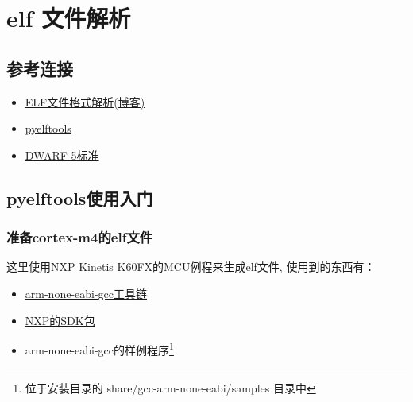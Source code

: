\chapter{elf 文件解析}

\section{参考连接}
\begin{itemize}  
    \item \href{https://www.openeuler.org/zh/blog/lijiajie128/2020-11-03-ELF文件格式解析.html}{ELF文件格式解析(博客)}
    \item \href{https://github.com/eliben/pyelftools}{pyelftools}
    \item \href{https://dwarfstd.org/doc/DWARF5.pdf}{DWARF 5标准}
\end{itemize}

\section{pyelftools使用入门}

\subsection{准备cortex-m4的elf文件}

这里使用NXP Kinetis K60FX的MCU例程来生成elf文件,
使用到的东西有：
\begin{itemize}
    \item \href{https://developer.arm.com/-/media/Files/downloads/gnu/13.2.rel1/binrel/arm-gnu-toolchain-13.2.rel1-x86_64-arm-none-eabi.tar.xz}{arm-none-eabi-gcc工具链}
    \item \href{https://mcuxpresso.nxp.com/}{NXP的SDK包}
    \item arm-none-eabi-gcc的样例程序\footnote{位于安装目录的 share/gcc-arm-none-eabi/samples 目录中}
\end{itemize}

